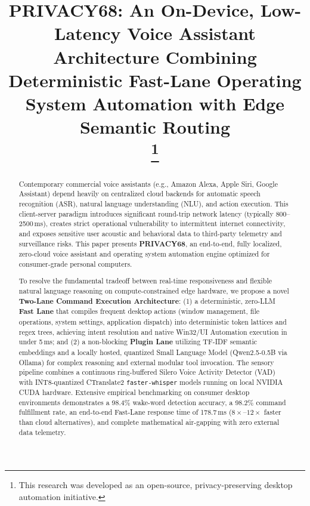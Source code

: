 \documentclass[conference]{IEEEtran}
\begin{document}
\title{PRIVACY68: An On-Device, Low-Latency Voice Assistant Architecture Combining Deterministic Fast-Lane Operating System Automation with Edge Semantic Routing\\
\thanks{This research was developed as an open-source, privacy-preserving desktop automation initiative.}
}

\author{
}

\maketitle

\begin{abstract}
Contemporary commercial voice assistants (e.g., Amazon Alexa, Apple Siri, Google Assistant) depend heavily on centralized cloud backends for automatic speech recognition (ASR), natural language understanding (NLU), and action execution. This client-server paradigm introduces significant round-trip network latency (typically 800--2500\,ms), creates strict operational vulnerability to intermittent internet connectivity, and exposes sensitive user acoustic and behavioral data to third-party telemetry and surveillance risks. This paper presents \textbf{PRIVACY68}, an end-to-end, fully localized, zero-cloud voice assistant and operating system automation engine optimized for consumer-grade personal computers. 

To resolve the fundamental tradeoff between real-time responsiveness and flexible natural language reasoning on compute-constrained edge hardware, we propose a novel \textbf{Two-Lane Command Execution Architecture}: (1) a deterministic, zero-LLM \textbf{Fast Lane} that compiles frequent desktop actions (window management, file operations, system settings, application dispatch) into deterministic token lattices and regex trees, achieving intent resolution and native Win32/UI Automation execution in under 5\,ms; and (2) a non-blocking \textbf{Plugin Lane} utilizing TF-IDF semantic embeddings and a locally hosted, quantized Small Language Model (Qwen2.5-0.5B via Ollama) for complex reasoning and external modular tool invocation. The sensory pipeline combines a continuous ring-buffered Silero Voice Activity Detector (VAD) with INT8-quantized CTranslate2 \texttt{faster-whisper} models running on local NVIDIA CUDA hardware. Extensive empirical benchmarking on consumer desktop environments demonstrates a 98.4\% wake-word detection accuracy, a 98.2\% command fulfillment rate, an end-to-end Fast-Lane response time of 178.7\,ms ($8\times\text{--}12\times$ faster than cloud alternatives), and complete mathematical air-gapping with zero external data telemetry.
\end{abstract}
\end{document}
